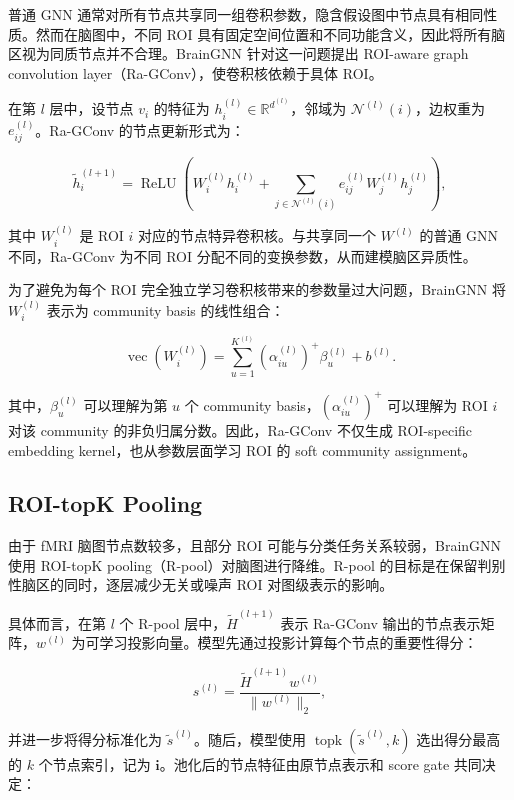 普通 GNN 通常对所有节点共享同一组卷积参数，隐含假设图中节点具有相同性质。然而在脑图中，不同 ROI 具有固定空间位置和不同功能含义，因此将所有脑区视为同质节点并不合理。BrainGNN 针对这一问题提出 ROI-aware graph convolution layer（Ra-GConv），使卷积核依赖于具体 ROI。

在第 $l$ 层中，设节点 $v_i$ 的特征为 $h_i^{(l)}\in\mathbb{R}^{d^{(l)}}$，邻域为 $\mathcal{N}^{(l)}(i)$，边权重为 $e_{ij}^{(l)}$。Ra-GConv 的节点更新形式为：

\begin{equation}
  \tilde{h}_i^{(l+1)}
  =
  \operatorname{ReLU}
  \left(
  W_i^{(l)}h_i^{(l)}
  +
  \sum_{j\in \mathcal{N}^{(l)}(i)}
  e_{ij}^{(l)}W_j^{(l)}h_j^{(l)}
  \right),
\end{equation}

其中 $W_i^{(l)}$ 是 ROI $i$ 对应的节点特异卷积核。与共享同一个 $W^{(l)}$ 的普通 GNN 不同，Ra-GConv 为不同 ROI 分配不同的变换参数，从而建模脑区异质性。

为了避免为每个 ROI 完全独立学习卷积核带来的参数量过大问题，BrainGNN 将 $W_i^{(l)}$ 表示为 community basis 的线性组合：

\begin{equation}
  \operatorname{vec}(W_i^{(l)})
  =
  \sum_{u=1}^{K^{(l)}}
  (\alpha_{iu}^{(l)})^+\beta_u^{(l)}
  +
  b^{(l)}.
\end{equation}

其中，$\beta_u^{(l)}$ 可以理解为第 $u$ 个 community basis，$(\alpha_{iu}^{(l)})^+$ 可以理解为 ROI $i$ 对该 community 的非负归属分数。因此，Ra-GConv 不仅生成 ROI-specific embedding kernel，也从参数层面学习 ROI 的 soft community assignment。

\subsection{ROI-topK Pooling}

由于 fMRI 脑图节点数较多，且部分 ROI 可能与分类任务关系较弱，BrainGNN 使用 ROI-topK pooling（R-pool）对脑图进行降维。R-pool 的目标是在保留判别性脑区的同时，逐层减少无关或噪声 ROI 对图级表示的影响。

具体而言，在第 $l$ 个 R-pool 层中，$\tilde{H}^{(l+1)}$ 表示 Ra-GConv 输出的节点表示矩阵，$w^{(l)}$ 为可学习投影向量。模型先通过投影计算每个节点的重要性得分：

\begin{equation}
  s^{(l)}
  =
  \frac{\tilde{H}^{(l+1)}w^{(l)}}{\|w^{(l)}\|_2},
\end{equation}

并进一步将得分标准化为 $\tilde{s}^{(l)}$。随后，模型使用 $\operatorname{topk}(\tilde{s}^{(l)},k)$ 选出得分最高的 $k$ 个节点索引，记为 $\mathbf{i}$。池化后的节点特征由原节点表示和 score gate 共同决定：

